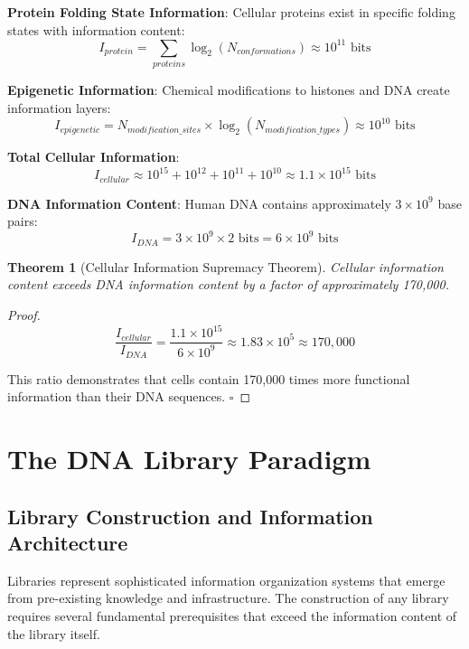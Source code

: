 \documentclass[12pt,a4paper]{article}
\newtheorem{theorem}{Theorem}[section]
\begin{document}
\textbf{Protein Folding State Information}:
Cellular proteins exist in specific folding states with information content:
$$I_{protein} = \sum_{proteins} \log_2(N_{conformations}) \approx 10^{11} \text{ bits}$$

\textbf{Epigenetic Information}:
Chemical modifications to histones and DNA create information layers:
$$I_{epigenetic} = N_{modification\_sites} \times \log_2(N_{modification\_types}) \approx 10^{10} \text{ bits}$$

\textbf{Total Cellular Information}:
$$I_{cellular} \approx 10^{15} + 10^{12} + 10^{11} + 10^{10} \approx 1.1 \times 10^{15} \text{ bits}$$

\textbf{DNA Information Content}:
Human DNA contains approximately $3 \times 10^9$ base pairs:
$$I_{DNA} = 3 \times 10^9 \times 2 \text{ bits} = 6 \times 10^9 \text{ bits}$$

\begin{theorem}[Cellular Information Supremacy Theorem]
Cellular information content exceeds DNA information content by a factor of approximately 170,000.
\end{theorem}

\begin{proof}
$$\frac{I_{cellular}}{I_{DNA}} = \frac{1.1 \times 10^{15}}{6 \times 10^9} \approx 1.83 \times 10^5 \approx 170,000$$

This ratio demonstrates that cells contain 170,000 times more functional information than their DNA sequences. $\square$
\end{proof}

\section{The DNA Library Paradigm}

\subsection{Library Construction and Information Architecture}

Libraries represent sophisticated information organization systems that emerge from pre-existing knowledge and infrastructure. The construction of any library requires several fundamental prerequisites that exceed the information content of the library itself.
\end{document}
